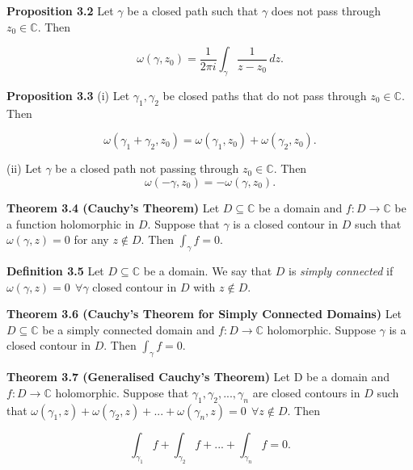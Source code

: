 \documentclass{article}
\begin{document}
\textbf{Proposition 3.2} Let $\gamma$ be a closed path such that $\gamma$ does not pass through $z_0 \in \mathbb{C}$. Then 

\begin{equation}
    \omega(\gamma, z_0) = \frac{1}{2 \pi i} \int_{\gamma} \frac{1}{z-z_0} \, dz.
\end{equation}

\bigskip

\textbf{Proposition 3.3} (i) Let $\gamma_1, \gamma_2$ be closed paths that do not pass through $z_0 \in \mathbb{C}.$ Then 

\begin{equation}
\omega(\gamma_1 + \gamma_2, z_0) = \omega(\gamma_1, z_0) + \omega(\gamma_2, z_0).
\end{equation}

\medskip

(ii) Let $\gamma$ be a closed path not passing through $z_0 \in \mathbb{C}.$ Then
\begin{equation}
    \omega(-\gamma, z_0) = -\omega(\gamma, z_0).
\end{equation}

\bigskip

\textbf{Theorem 3.4 (Cauchy's Theorem)} Let $D \subseteq \mathbb{C}$ be a domain and $f:D \rightarrow \mathbb{C}$ be a function holomorphic in $D$. Suppose that $\gamma$ is a closed contour in $D$ such that $\omega(\gamma, z) = 0$ for any $z \notin D.$ Then $\int_{\gamma} f = 0.$ 

\bigskip

\textbf{Definition 3.5} Let $D \subseteq \mathbb{C}$ be a domain. We say that $D$ is {\it{simply connected}} if $\omega(\gamma, z) = 0 \ \ \forall \gamma$ closed contour in $D$ with $z \notin D.$

\bigskip

\textbf{Theorem 3.6 (Cauchy's Theorem for Simply Connected Domains)} Let $D \subseteq \mathbb{C}$ be a simply connected domain and $f:D \rightarrow \mathbb{C}$ holomorphic. Suppose $\gamma$ is a closed contour in $D.$ Then  $\int_{\gamma} f = 0.$
\bigskip

\textbf{Theorem 3.7 (Generalised Cauchy's Theorem)} Let D be a domain and $f:D \rightarrow \mathbb{C}$ holomorphic. Suppose that $\gamma_1, \gamma_2, ..., \gamma_n$ are closed contours in $D$ such that $\omega(\gamma_1, z) + \omega(\gamma_2, z) + ... + \omega(\gamma_n, z) = 0 \ \ \forall z \notin D.$ Then 

\begin{equation}
    \int_{\gamma_1} f + \int_{\gamma_2} f + ... + \int_{\gamma_n} f = 0.
\end{equation}
\end{document}
